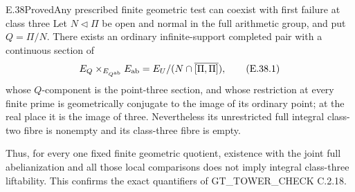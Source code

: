 \begin{result}{E.38}{Proved}{Any prescribed finite geometric test can coexist with first failure at class three}
\label{coh:arbitrary-finite-first-three}
Let $N\triangleleft\Pi$ be open and normal in the full arithmetic
group, and put $Q=\Pi/N$.  There exists an ordinary
infinite-support completed pair with a continuous section of
\[
 E_Q\times_{E_{Q^{\rm ab}}}E_{\rm ab}
       =E_U/(N\cap\overline{[\Pi,\Pi]}),
 \tag{E.38.1}
\]
whose $Q$-component is the point-three section, and whose
restriction at every finite prime is geometrically conjugate
to the image of its ordinary point; at the real place it is
the image of three.  Nevertheless its unrestricted full
integral class-two fibre is nonempty and its class-three
fibre is empty.

Thus, for every one fixed finite geometric quotient, existence
with the joint full abelianization and all those local
comparisons does not imply integral class-three liftability.
This confirms the exact quantifiers of GT\_TOWER\_CHECK C.2.18.
\end{result}
